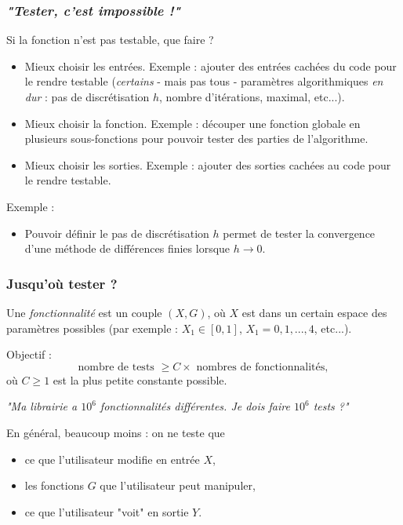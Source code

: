 \documentclass{beamer}
\begin{document}
\begin{frame}[containsverbatim]
\frametitle{\emph{"Tester, c'est impossible !"}}
Si la fonction n'est pas testable, que faire ?
\begin{itemize}
\item Mieux choisir les entrées. 
Exemple : ajouter des entrées cachées du code pour le 
rendre testable (\emph{certains} - mais pas tous - 
paramètres algorithmiques \emph{en dur} : pas de discrétisation $h$, 
nombre d'itérations, maximal, etc...).
\item Mieux choisir la fonction. 
Exemple : découper une fonction globale en plusieurs 
sous-fonctions pour pouvoir tester des parties de l'algorithme.
\item Mieux choisir les sorties. 
Exemple : ajouter des sorties cachées au code pour le rendre testable. 
\end{itemize}

Exemple :
\begin{itemize}
\item Pouvoir définir le pas de discrétisation $h$ 
permet de tester la convergence d'une méthode de différences 
finies lorsque $h\rightarrow 0$.
\end{itemize}

\end{frame}


\begin{frame}[containsverbatim]
\frametitle{Jusqu'où tester ?}

Une \emph{fonctionnalité} est un couple $(X,G)$, où $X$ est dans 
un certain espace des paramètres possibles (par exemple : $X_1\in[0,1]$, 
$X_1=0,1,...,4$, etc...).

Objectif : 
$$
\textrm{nombre de tests }\geq C \times \textrm{ nombres de fonctionnalités}, 
$$
où $C\geq 1$ est la plus petite constante possible.

\emph{"Ma librairie a $10^6$ fonctionnalités différentes. Je 
dois faire $10^6$ tests ?"}

En général, beaucoup moins : on ne teste que 
\begin{itemize}
\item ce que l'utilisateur modifie en entrée $X$,
\item les fonctions $G$ que l'utilisateur peut manipuler, 
\item ce que l'utilisateur "voit" en sortie $Y$.
\end{itemize}

\end{frame}
\end{document}
